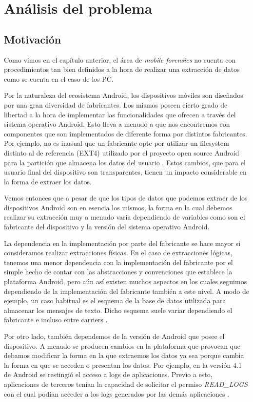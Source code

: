 \chapter{Análisis del problema}

\section{Motivación}
Como vimos en el capítulo anterior, el área de \emph{mobile forensics} no cuenta con procedimientos tan bien definidos a la hora de realizar una extracción de datos como se cuenta en el caso de los PC.

Por la naturaleza del ecosistema Android, los dispositivos móviles son diseñados por una gran diversidad de fabricantes. Los mismos poseen cierto grado de libertad a la hora de implementar las funcionalidades que ofrecen a través del sistema operativo Android. Esto lleva a menudo a que nos encontremos con componentes que son implementados de diferente forma por distintos fabricantes. Por ejemplo, no es inusual que un fabricante opte por utilizar un filesystem distinto al de referencia (EXT4) utilizado por el proyecto open source Android para la partición que almacena los datos del usuario \cite{adrdstrg}. Estos cambios, que para el usuario final del dispositivo son transparentes, tienen un impacto considerable en la forma de extraer los datos.

Vemos entonces que a pesar de que los tipos de datos que podemos extraer de los dispositivos Android son en esencia los mismos, la forma en la cual debemos realizar su extracción muy a menudo varía dependiendo de variables como son el fabricante del dispositivo y la versión del sistema operativo Android.

La dependencia en la implementación por parte del fabricante se hace mayor si consideramos realizar extracciones físicas. En el caso de extracciones lógicas, tenemos una menor dependencia con la implementación del fabricante por el simple hecho de contar con las abstracciones y convenciones que establece la plataforma Android, pero aún así existen muchos aspectos en los cuales seguimos dependiendo de la implementación del fabricante también a este nivel. A modo de ejemplo, un caso habitual es el esquema de la base de datos utilizada para almacenar los mensajes de texto. Dicho esquema suele variar dependiendo el fabricante e incluso entre carriers \cite{delsms}.

Por otro lado, también dependemos de la versión de Android que posee el dispositivo. A menudo se producen cambios en la plataforma que provocan que debamos modificar la forma en la que extraemos los datos ya sea porque cambia la forma en que se acceden o presentan los datos. Por ejemplo, en la versión 4.1 de Android se restingió el acceso a logs de aplicaciones. Previo a esto, aplicaciones de terceros tenían la capacidad de solicitar el permiso \emph{READ\_LOGS} con el cual podían acceder a los logs generados por las demás aplicaciones \cite{logaccss}.

